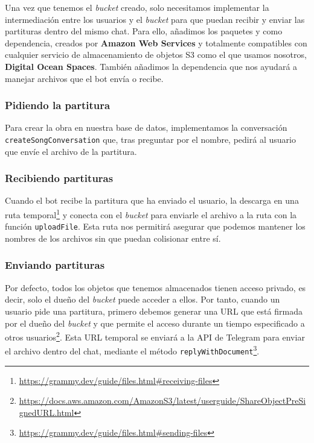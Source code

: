 Una vez que tenemos el \textit{bucket} creado, solo necesitamos implementar la intermediación entre los usuarios y el \textit{bucket} para que puedan recibir y enviar las partituras dentro del mismo chat. Para ello, añadimos los paquetes  y  como dependencia, creados por \textbf{Amazon Web Services} y totalmente compatibles con cualquier servicio de almacenamiento de objetos S3 como el que usamos nosotros, \textbf{Digital Ocean Spaces}. También añadimos la dependencia  que nos ayudará a manejar archivos que el bot envía o recibe.

\subsubsection{Pidiendo la partitura}

Para crear la obra en nuestra base de datos, implementamos la conversación \texttt{createSongConversation} que, tras preguntar por el nombre, pedirá al usuario que envíe el archivo de la partitura.

\subsubsection{Recibiendo partituras}

Cuando el bot recibe la partitura que ha enviado el usuario, la descarga en una ruta temporal\footnote{\url{https://grammy.dev/guide/files.html\#receiving-files}} y conecta con el \textit{bucket} para enviarle el archivo a la ruta  con la función \texttt{uploadFile}. Esta ruta nos permitirá asegurar que podemos mantener los nombres de los archivos sin que puedan colisionar entre sí.

\subsubsection{Enviando partituras}

Por defecto, todos los objetos que tenemos almacenados tienen acceso privado, es decir, solo el dueño del \textit{bucket} puede acceder a ellos. Por tanto, cuando un usuario pide una partitura, primero debemos generar una URL que está firmada por el dueño del \textit{bucket} y que permite el acceso durante un tiempo especificado a otros usuarios\footnote{\url{https://docs.aws.amazon.com/AmazonS3/latest/userguide/ShareObjectPreSignedURL.html}}. Esta URL temporal se enviará a la API de Telegram para enviar el archivo dentro del chat, mediante el método \texttt{replyWithDocument}\footnote{\url{https://grammy.dev/guide/files.html\#sending-files}}.

